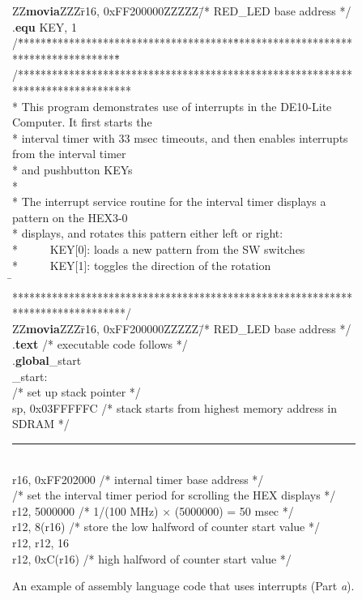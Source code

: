 \begin{figure}[h!]
\begin{center}
\begin{minipage}[t]{12.5 cm}
\begin{tabbing}
ZZ\={\bf movia}ZZZ\=r16, 0xFF200000ZZZZZ\=/* RED\_LED base address */\kill
\>.{\bf equ} \>KEY, 1\\
/\=*****\=*********************************\=****************************************\=\kill
/********************************************************************************\\
\>* This program demonstrates use of interrupts in the DE10-Lite Computer. It first starts the \\
\>* interval timer with 33 msec timeouts, and then enables interrupts from the interval
timer\\
\>* and pushbutton KEYs\\
\>*\\
\>* The interrupt service routine for the interval timer displays a pattern on the HEX3-0\\
\>* displays, and rotates this pattern either left or right:\\
\>* ~~~~~KEY[0]: loads a new pattern from the SW switches\\
\>* ~~~~~KEY[1]: toggles the direction of the rotation\\
\=\kill
\>********************************************************************************/\\
ZZ\={\bf movia}ZZZ\=r16, 0xFF200000ZZZZZ\=/* RED\_LED base address */\kill
\>.{\bf text}	\>\>/* executable code follows */\\
\>.{\bf global}\>\_start\\
\_start:\\
\>/* set up stack pointer */\\
 \>sp, 0x03FFFFFC \>/* stack starts from highest memory address in SDRAM */\\
\rule{6.0in}{0in}~\\
 \>r16, 0xFF202000 \>/* internal timer base address */\\
\>/* set the interval timer period for scrolling the HEX displays */\\
 \>r12, 5000000 \>/* 1/(100 MHz) $\times$ (5000000) = 50 msec */\\
 \>r12, 8(r16) \>/* store the low halfword of counter start value */ \\
 \>r12, r12, 16\\
 \>r12, 0xC(r16) \>/* high halfword of counter start value */ \\
\end{tabbing}
\end{minipage}
\end{center}
	\vspace{-0.33in}\caption{An example of assembly language code that uses interrupts
	(Part {\it a}).}
   \label{fig:interrupt_example_s}
\end{figure}
\pagebreak
\clearpage
\newpage

